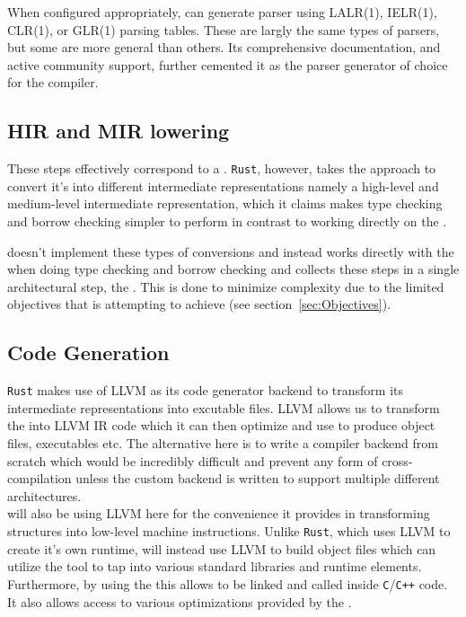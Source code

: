 When configured appropriately, \parserGen{} can generate parser using LALR(1),
IELR(1), CLR(1), or GLR(1) parsing tables. These are largly the
same types of parsers, but some are more general than others. Its comprehensive
documentation, and active community support, further cemented it as the
parser generator of choice for the \lang{} compiler.

\subsection{HIR and MIR lowering}
\label{sec:hirmir}

These steps effectively correspond to a \static{}. \texttt{Rust}, however, takes the approach
to convert it's \ast{} into different intermediate representations namely a
high-level and medium-level intermediate representation, which it claims makes type
checking and borrow checking simpler to perform in contrast to working directly on
the \ast. 

\lang{} doesn't implement these types of conversions and instead works directly with
the \ast{} when doing type checking and borrow checking and collects these steps in a
single architectural step, the \static. This is done to minimize complexity due to
the limited objectives that \lang{} is attempting to achieve (see
section~\ref{sec:Objectives}).

\subsection{Code Generation}
\label{sec:codeGenTech}

\texttt{Rust} makes use of LLVM as its code generator backend to transform its intermediate
representations into excutable files. LLVM allows us to transform the \ast{} into
LLVM IR code which it can then optimize and use to produce object files, executables
etc. The alternative here is to write a compiler backend from scratch which would be
incredibly difficult and prevent any form of cross-compilation unless the custom
backend is written to support multiple different architectures. \\

\lang{} will also be using LLVM here for the convenience it provides in transforming
\ast{} structures into low-level machine instructions. Unlike \texttt{Rust}, which uses LLVM
to create it's own runtime, \lang{} will instead use LLVM to build object files which
can utilize the \gcc{} tool to tap into various standard libraries and
runtime elements. Furthermore, by using the \gcc{} this allows \lang{} to be linked and
called inside \texttt{C}/\texttt{C++} code. It also allows \lang{} access to various
optimizations provided by the \gcc.

\newpage
